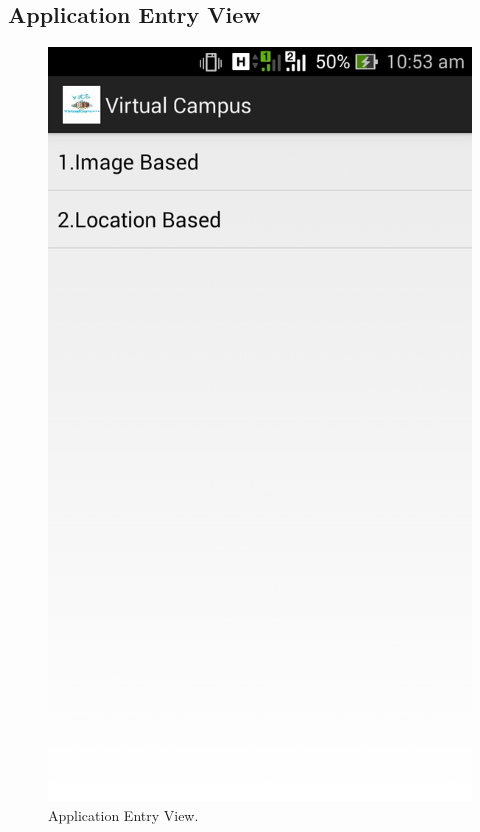 \documentclass{article}
\begin{document}
\subsection{Application Entry View}
\begin{center}
\begin{figure}[h]
	\includegraphics[scale=0.2,trim=0 30cm 0 0,clip=true]{AppEntryView.jpg}
	\caption{Application Entry View. }
\end{figure}
\end{center}
\end{document}
